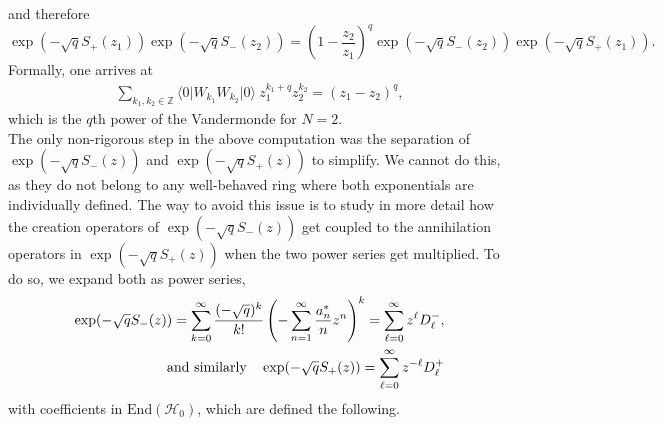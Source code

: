 \documentclass[letterpaper, DIV=17]{scrartcl}
\numberwithin{equation}{section}
\theoremstyle{definition}
\begin{document}
		and therefore
		\begin{equation} \label{BCH}
			\exp(-\sqrt{q} S_+(z_1)) \exp(-\sqrt{q} S_-(z_2)) =  \left( 1-\frac{z_2}{z_1} \right)^q  \exp(-\sqrt{q}S_-(z_2)) \exp(-\sqrt{q} S_+(z_1)).
		\end{equation}
		Formally, one arrives at 
		\begin{align*}
			\sum_{k_1, k_2\in \mathbb{Z}} \langle 0\vert W_{k_1} W_{k_2} \vert 0 \rangle \ z_1^{k_1+q} z_2^{k_2} =  (z_1-z_2)^q ,
		\end{align*}
		which is the $ q $th power of the Vandermonde for $ N = 2 $. \\
		
		
		The only non-rigorous step in the above computation was the separation of $\exp(-\sqrt{q}S_-(z))$ and $\exp(-\sqrt{q} S_+(z))$ to simplify. We cannot do this, as they do not belong to any well-behaved ring where both exponentials are individually defined. The way to avoid this issue is to study in more detail how the creation operators of $\exp(-\sqrt{q} S_-(z))$ get coupled to the annihilation operators in $\exp(-\sqrt{q}S_+(z))$ when the two power series get multiplied. To do so, we expand both as power series, 
	\begin{align}\label{eq:relSD}
			 \exp(-\sqrt{q} S_-(z))  =  
			\sum_{k=0}^\infty  \frac{(-\sqrt{q})^k}{k!} \left( -\sum_{n=1}^\infty \frac{a_{n}^*}{n} z^n \right)^k 
			= \sum_{\ell=0}^\infty z^\ell D_\ell^- , & \\
			 \mbox{and similarly}\quad \exp(-\sqrt{q} S_+(z))  =  \sum_{\ell=0}^\infty z^{-\ell} D_\ell^+  & \notag
		\end{align}
		with coefficients in $\mathrm{End}(\mathcal{H}_0)$, which are defined the following.
		
\end{document}
